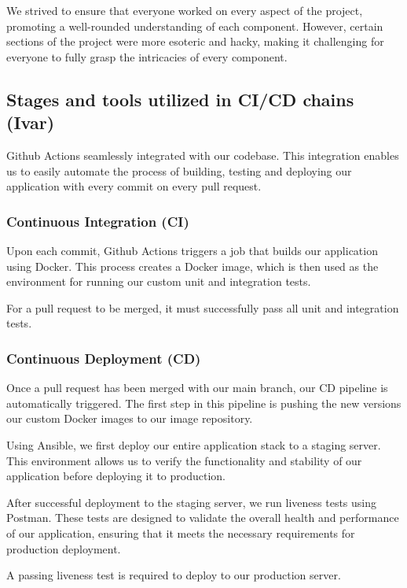 \documentclass{article}
\begin{document}
We strived to ensure that everyone worked on every aspect of the project, promoting a well-rounded understanding of each component. However, certain sections of the project were more esoteric and hacky, making it challenging for everyone to fully grasp the intricacies of every component. 


\subsection{Stages and tools utilized in CI/CD chains (Ivar)}

Github Actions seamlessly integrated with our codebase. This integration enables us to easily automate the process of building, testing and deploying our application with every commit on every pull request.

\subsubsection{Continuous Integration (CI)}

Upon each commit, Github Actions triggers a job that builds our application using Docker. This process creates a Docker image, which is then used as the environment for running our custom unit and integration tests.

For a pull request to be merged, it must successfully pass all unit and integration tests.

\subsubsection{Continuous Deployment (CD)}

Once a pull request has been merged with our main branch, our CD pipeline is automatically triggered. 
The first step in this pipeline is pushing the new versions our custom Docker images to our image repository. 

Using Ansible, we first deploy our entire application stack to a staging server. This environment allows us to verify the functionality and stability of our application before deploying it to production.

After successful deployment to the staging server, we run liveness tests using Postman. These tests are designed to validate the overall health and performance of our application, ensuring that it meets the necessary requirements for production deployment.

A passing liveness test is required to deploy to our production server. 
\end{document}
